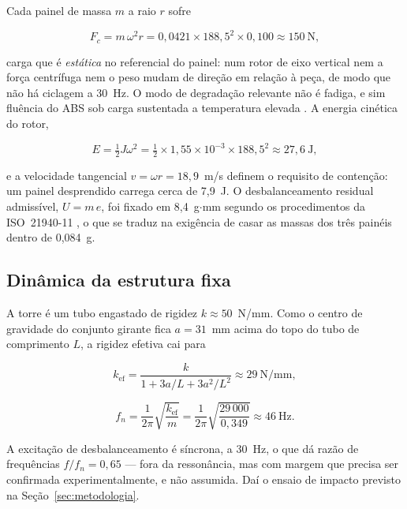 \documentclass[10pt,a4paper,twocolumn]{article}
\begin{document}
Cada painel de massa $m$ a raio $r$ sofre

\begin{equation}
F_c = m\,\omega^2 r = 0{,}0421 \times 188{,}5^2 \times 0{,}100
\approx 150~\mathrm{N},
\label{eq:fc}
\end{equation}

\noindent carga que é \emph{estática} no referencial do painel: num rotor de eixo
vertical nem a força centrífuga nem o peso mudam de direção em relação à peça,
de modo que não há ciclagem a 30~Hz. O modo de degradação relevante não é
fadiga, e sim fluência do ABS sob carga sustentada a temperatura elevada
\cite{ashby2016}. A energia cinética do rotor,

\begin{equation}
E = \tfrac{1}{2} J \omega^2
  = \tfrac{1}{2} \times 1{,}55\times10^{-3} \times 188{,}5^2
  \approx 27{,}6~\mathrm{J},
\label{eq:energia}
\end{equation}

\noindent e a velocidade tangencial $v=\omega r = 18{,}9$~m/s definem o requisito de
contenção: um painel desprendido carrega cerca de 7,9~J. O desbalanceamento
residual admissível, $U = m\,e$, foi fixado em 8,4~g$\cdot$mm segundo os
procedimentos da ISO~21940-11 \cite{iso21940}, o que se traduz na exigência de
casar as massas dos três painéis dentro de 0,084~g.

\subsection{Dinâmica da estrutura fixa}

A torre é um tubo engastado de rigidez $k \approx 50$~N/mm. Como o centro de
gravidade do conjunto girante fica $a=31$~mm acima do topo do tubo de
comprimento $L$, a rigidez efetiva cai para \cite{rao2018}

\begin{equation}
k_{\mathrm{ef}} = \frac{k}{1 + 3a/L + 3a^2/L^2} \approx 29~\mathrm{N/mm},
\label{eq:keff}
\end{equation}

\begin{equation}
f_n = \frac{1}{2\pi}\sqrt{\frac{k_{\mathrm{ef}}}{m}}
    = \frac{1}{2\pi}\sqrt{\frac{29\,000}{0{,}349}} \approx 46~\mathrm{Hz}.
\label{eq:fn}
\end{equation}

A excitação de desbalanceamento é síncrona, a 30~Hz, o que dá razão de
frequências $f/f_n = 0{,}65$ --- fora da ressonância, mas com margem que
precisa ser confirmada experimentalmente, e não assumida. Daí o ensaio de
impacto previsto na Seção~\ref{sec:metodologia}.
\end{document}
